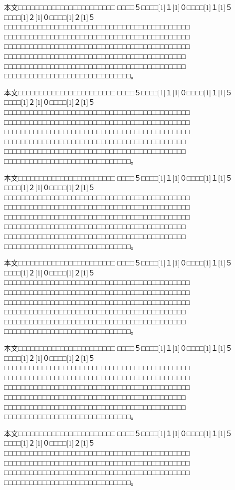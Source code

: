 \documentclass[platex,fleqn]{ieej-tec2}%
\begin{document}
{本文□□□□□□□□□□□□□□□□□□□□□□□
□□□□５□□□□\scalebox{0.5}[1]{１}\scalebox{0.5}[1]{０}□□□□\scalebox{0.5}[1]{１}\scalebox{0.5}[1]{５}□□□□\scalebox{0.5}[1]{２}\scalebox{0.5}[1]{０}□□□□\scalebox{0.5}[1]{２}\scalebox{0.5}[1]{５}□□□□□□□□□□□□□□□□□□□□□□□□□□□□□□□□□□□□□□□□□□□□
□□□□□□□□□□□□□□□□□□□□□□□□□□□□□□□□□□□□□□□□□□□□
□□□□□□□□□□□□□□□□□□□□□□□□□□□□□□□□□□□□□□□□□□□□
□□□□□□□□□□□□□□□□□□□□□□□□□□□□□□□□□□□□□□□□□□□
□□□□□□□□□□□□□□□□□□□□□□□□□□□□□□□□□□□□□□□□□□□
□□□□□□□□□□□□□□□□□□□□□□□□□□□□□□。

本文□□□□□□□□□□□□□□□□□□□□□□□
□□□□５□□□□\scalebox{0.5}[1]{１}\scalebox{0.5}[1]{０}□□□□\scalebox{0.5}[1]{１}\scalebox{0.5}[1]{５}□□□□\scalebox{0.5}[1]{２}\scalebox{0.5}[1]{０}□□□□\scalebox{0.5}[1]{２}\scalebox{0.5}[1]{５}□□□□□□□□□□□□□□□□□□□□□□□□□□□□□□□□□□□□□□□□□□□□
□□□□□□□□□□□□□□□□□□□□□□□□□□□□□□□□□□□□□□□□□□□□
□□□□□□□□□□□□□□□□□□□□□□□□□□□□□□□□□□□□□□□□□□□□
□□□□□□□□□□□□□□□□□□□□□□□□□□□□□□□□□□□□□□□□□□□
□□□□□□□□□□□□□□□□□□□□□□□□□□□□□□□□□□□□□□□□□□□
□□□□□□□□□□□□□□□□□□□□□□□□□□□□□□。

本文□□□□□□□□□□□□□□□□□□□□□□□
□□□□５□□□□\scalebox{0.5}[1]{１}\scalebox{0.5}[1]{０}□□□□\scalebox{0.5}[1]{１}\scalebox{0.5}[1]{５}□□□□\scalebox{0.5}[1]{２}\scalebox{0.5}[1]{０}□□□□\scalebox{0.5}[1]{２}\scalebox{0.5}[1]{５}□□□□□□□□□□□□□□□□□□□□□□□□□□□□□□□□□□□□□□□□□□□□
□□□□□□□□□□□□□□□□□□□□□□□□□□□□□□□□□□□□□□□□□□□□
□□□□□□□□□□□□□□□□□□□□□□□□□□□□□□□□□□□□□□□□□□□□
□□□□□□□□□□□□□□□□□□□□□□□□□□□□□□□□□□□□□□□□□□□
□□□□□□□□□□□□□□□□□□□□□□□□□□□□□□□□□□□□□□□□□□□
□□□□□□□□□□□□□□□□□□□□□□□□□□□□□□。

本文□□□□□□□□□□□□□□□□□□□□□□□
□□□□５□□□□\scalebox{0.5}[1]{１}\scalebox{0.5}[1]{０}□□□□\scalebox{0.5}[1]{１}\scalebox{0.5}[1]{５}□□□□\scalebox{0.5}[1]{２}\scalebox{0.5}[1]{０}□□□□\scalebox{0.5}[1]{２}\scalebox{0.5}[1]{５}□□□□□□□□□□□□□□□□□□□□□□□□□□□□□□□□□□□□□□□□□□□□
□□□□□□□□□□□□□□□□□□□□□□□□□□□□□□□□□□□□□□□□□□□□
□□□□□□□□□□□□□□□□□□□□□□□□□□□□□□□□□□□□□□□□□□□□
□□□□□□□□□□□□□□□□□□□□□□□□□□□□□□□□□□□□□□□□□□□
□□□□□□□□□□□□□□□□□□□□□□□□□□□□□□□□□□□□□□□□□□□
□□□□□□□□□□□□□□□□□□□□□□□□□□□□□□。

本文□□□□□□□□□□□□□□□□□□□□□□□
□□□□５□□□□\scalebox{0.5}[1]{１}\scalebox{0.5}[1]{０}□□□□\scalebox{0.5}[1]{１}\scalebox{0.5}[1]{５}□□□□\scalebox{0.5}[1]{２}\scalebox{0.5}[1]{０}□□□□\scalebox{0.5}[1]{２}\scalebox{0.5}[1]{５}□□□□□□□□□□□□□□□□□□□□□□□□□□□□□□□□□□□□□□□□□□□□
□□□□□□□□□□□□□□□□□□□□□□□□□□□□□□□□□□□□□□□□□□□□
□□□□□□□□□□□□□□□□□□□□□□□□□□□□□□□□□□□□□□□□□□□□
□□□□□□□□□□□□□□□□□□□□□□□□□□□□□□□□□□□□□□□□□□□
□□□□□□□□□□□□□□□□□□□□□□□□□□□□□□□□□□□□□□□□□□□
□□□□□□□□□□□□□□□□□□□□□□□□□□□□□□。

本文□□□□□□□□□□□□□□□□□□□□□□□
□□□□５□□□□\scalebox{0.5}[1]{１}\scalebox{0.5}[1]{０}□□□□\scalebox{0.5}[1]{１}\scalebox{0.5}[1]{５}□□□□\scalebox{0.5}[1]{２}\scalebox{0.5}[1]{０}□□□□\scalebox{0.5}[1]{２}\scalebox{0.5}[1]{５}□□□□□□□□□□□□□□□□□□□□□□□□□□□□□□□□□□□□□□□□□□□□
□□□□□□□□□□□□□□□□□□□□□□□□□□□□□□□□□□□□□□□□□□□□
□□□□□□□□□□□□□□□□□□□□□□□□□□□□□□□□□□□□□□□□□□□□
□□□□□□□□□□□□□□□□□□□□□□□□□□□□□□。

}
\end{document}
